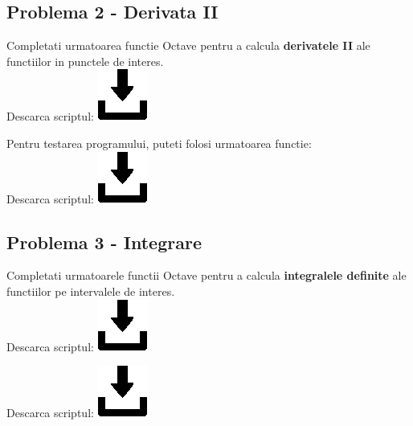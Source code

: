 \documentclass{article}
\begin{document}
\subsection{Problema 2 - Derivata II}
\tab Completati urmatoarea functie Octave pentru a calcula \textbf{derivatele II} ale functiilor in punctele de interes.\\
\tabto{0.5cm} Descarca scriptul:
\href{https://github.com/Iulian277/Numerical-Differentiation-and-Integration/blob/main/Derivare/A\%20doua\%20derivata/ThreePoints.m}{\includegraphics[scale=0.35]{download_button}}


Pentru testarea programului, puteti folosi urmatoarea functie:\\
\tabto{0.5cm} Descarca scriptul:
\href{https://github.com/Iulian277/Numerical-Differentiation-and-Integration/blob/main/Derivare/A\%20doua\%20derivata/testare_derivate.m}{\includegraphics[scale=0.35]{download_button}}
 \vspace{0.5cm}


\subsection{Problema 3 - Integrare}
\tab Completati urmatoarele functii Octave pentru a calcula \textbf{integralele definite} ale functiilor pe intervalele de interes.\\
\tabto{0.5cm} Descarca scriptul:
\href{https://github.com/Iulian277/Numerical-Differentiation-and-Integration/blob/main/Integrare/Newton-Cotes/trapez_simplu.m}{\includegraphics[scale=0.35]{download_button}}
 \newpage

\tabto{0.5cm} Descarca scriptul:
\href{https://github.com/Iulian277/Numerical-Differentiation-and-Integration/blob/main/Integrare/Newton-Cotes/trapez_compus.m}{\includegraphics[scale=0.35]{download_button}}

\end{document}
